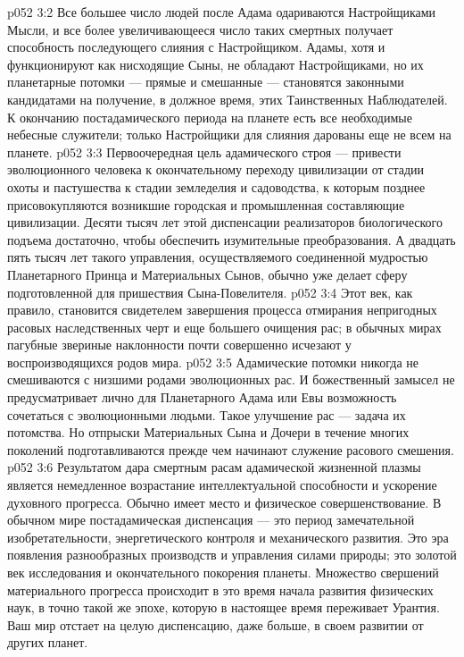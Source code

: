\vs p052 3:2 Все большее число людей после Адама одариваются Настройщиками Мысли, и все более увеличивающееся число таких смертных получает способность последующего слияния с Настройщиком. Адамы, хотя и функционируют как нисходящие Сыны, не обладают Настройщиками, но их планетарные потомки --- прямые и смешанные --- становятся законными кандидатами на получение, в должное время, этих Таинственных Наблюдателей. К окончанию постадамического периода на планете есть все необходимые небесные служители; только Настройщики для слияния дарованы еще не всем на планете.
\vs p052 3:3 \pc Первоочередная цель адамического строя --- привести эволюционного человека к окончательному переходу цивилизации от стадии охоты и пастушества к стадии земледелия и садоводства, к которым позднее присовокупляются возникшие городская и промышленная составляющие цивилизации. Десяти тысяч лет этой диспенсации реализаторов биологического подъема достаточно, чтобы обеспечить изумительные преобразования. А двадцать пять тысяч лет такого управления, осуществляемого соединенной мудростью Планетарного Принца и Материальных Сынов, обычно уже делает сферу подготовленной для пришествия Сына\hyp{}Повелителя.
\vs p052 3:4 \pc Этот век, как правило, становится свидетелем завершения процесса отмирания непригодных расовых наследственных черт и еще большего очищения рас; в обычных мирах пагубные звериные наклонности почти совершенно исчезают у воспроизводящихся родов мира.
\vs p052 3:5 Адамические потомки никогда не смешиваются с низшими родами эволюционных рас. И божественный замысел не предусматривает лично для Планетарного Адама или Евы возможность сочетаться с эволюционными людьми. Такое улучшение рас --- задача их потомства. Но отпрыски Материальных Сына и Дочери в течение многих поколений подготавливаются прежде чем начинают служение расового смешения.
\vs p052 3:6 Результатом дара смертным расам адамической жизненной плазмы является немедленное возрастание интеллектуальной способности и ускорение духовного прогресса. Обычно имеет место и физическое совершенствование. В обычном мире постадамическая диспенсация --- это период замечательной изобретательности, энергетического контроля и механического развития. Это эра появления разнообразных производств и управления силами природы; это золотой век исследования и окончательного покорения планеты. Множество свершений материального прогресса происходит в это время начала развития физических наук, в точно такой же эпохе, которую в настоящее время переживает Урантия. Ваш мир отстает на целую диспенсацию, даже больше, в своем развитии от других планет.

